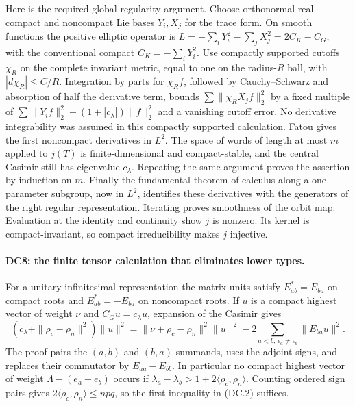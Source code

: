 Here is the required global regularity argument.  Choose orthonormal real
compact and noncompact Lie bases $Y_i,X_j$ for the trace form.  On smooth
functions the positive elliptic operator is
$L=-\sum_iY_i^2-\sum_jX_j^2=2C_K-C_G$, with the conventional compact
$C_K=-\sum_iY_i^2$.  Use compactly supported cutoffs $\chi_R$ on the
complete invariant metric, equal to one on the radius-$R$ ball, with
$|d\chi_R|\le C/R$.  Integration by parts for $\chi_R f$, followed by
Cauchy--Schwarz and absorption of half the derivative term, bounds
$\sum\|\chi_R X_jf\|_2^2$ by a fixed multiple of
$\sum\|Y_if\|_2^2+(1+|c_\lambda|)\|f\|_2^2$ and a vanishing cutoff
error.  No derivative integrability was assumed in this compactly
supported calculation.  Fatou gives the first noncompact derivatives
in $L^2$.  The space of words of length at most $m$ applied to $j(T)$
is finite-dimensional and compact-stable, and the central Casimir
still has eigenvalue $c_\lambda$.  Repeating the same argument proves
the assertion by induction on $m$.
Finally the fundamental theorem of calculus along a one-parameter
subgroup, now in $L^2$, identifies these derivatives with the generators
of the right regular representation.  Iterating proves smoothness of
the orbit map.  Evaluation at the identity and continuity show $j$ is
nonzero.  Its kernel is compact-invariant, so compact irreducibility
makes $j$ injective.

\paragraph{DC8: the finite tensor calculation that eliminates lower types.}
\label{claim:DC8}
For a unitary infinitesimal representation the matrix units satisfy
$E_{ab}^*=E_{ba}$ on compact roots and $E_{ab}^*=-E_{ba}$ on
noncompact roots.  If $u$ is a compact highest vector of weight $\nu$
and $C_Gu=c_\lambda u$, expansion of the Casimir gives
\[
 (c_\lambda+\|\rho_c-\rho_n\|^2)\|u\|^2
 =\|\nu+\rho_c-\rho_n\|^2\|u\|^2
       -2\sum_{a<b,\,\epsilon_a\ne\epsilon_b}\|E_{ba}u\|^2.    \tag{DC.12}
\]
The proof pairs the $(a,b)$ and $(b,a)$ summands, uses the adjoint signs,
and replaces their commutator by $E_{aa}-E_{bb}$.  In particular no
compact highest vector of weight $\Lambda-(e_a-e_b)$ occurs if
$\lambda_a-\lambda_b>1+2\langle\rho_c,\rho_n\rangle$.
Counting ordered sign pairs gives
$2\langle\rho_c,\rho_n\rangle\le npq$, so the first inequality in
(DC.2) suffices.

